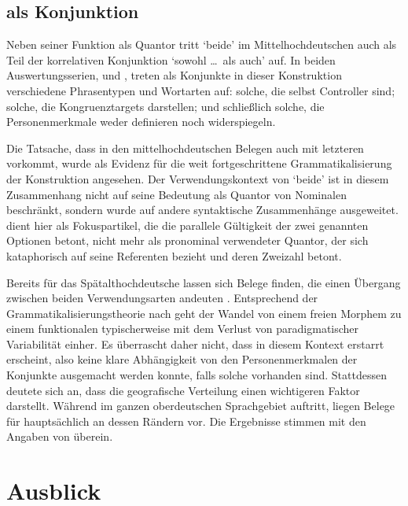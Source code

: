 \subsection{ als Konjunktion}

Neben seiner Funktion als Quantor tritt `beide' im
Mittelhochdeutschen auch als Teil der korrelativen
Konjunktion  `sowohl \dots\ als auch' auf. In beiden
Auswertungs\-serien, \CAO{} und \KC{}, treten als Konjunkte in dieser
Konstruktion verschiedene Phrasen\-typen und Wort\-arten auf: solche, die
selbst Controller sind; solche, die Kongruenztargets darstellen; und
schließlich solche, die Personenmerkmale weder definieren noch widerspiegeln.

Die Tatsache, dass  in den
mittelhochdeutschen Belegen auch mit letzteren vorkommt,
wurde als Evidenz für die weit fortgeschrittene Grammatikalisierung der
Konstruktion angesehen. Der Verwendungskontext von  `beide' ist in
diesem Zusammenhang nicht auf seine Bedeutung als Quantor von Nominalen
beschränkt, sondern wurde auf andere syntaktische Zusammenhänge ausgeweitet.
 dient hier als Fokuspartikel, die die parallele Gültigkeit der
zwei genannten Optionen betont, nicht mehr als pronominal verwendeter Quantor,
der sich kataphorisch auf seine Referenten bezieht und deren Zweizahl betont.

Bereits für das Spätalthochdeutsche lassen sich Belege
finden, die einen Übergang zwischen beiden Verwendungsarten
andeuten \autocite[vgl.\ die Beispiele in][627]{ksw2}. Entsprechend der
Grammatikalisierungstheorie nach \citet[146--150]{lehmann2015} geht der Wandel
von einem freien Morphem zu einem funktionalen typischerweise mit dem Verlust
von paradigmatischer Variabilität einher. Es überrascht daher nicht, dass
 in diesem Kontext erstarrt erscheint, also keine klare
Abhängigkeit von den Personenmerkmalen der Konjunkte ausgemacht werden konnte,
falls solche vorhanden sind. Stattdessen deutete sich an, dass die geografische
Verteilung einen wichtigeren Faktor darstellt. Während  im ganzen
oberdeutschen Sprachgebiet auftritt, liegen Belege für
 hauptsächlich an dessen Rändern vor. Die Ergebnisse stimmen mit
den Angaben von \citet[627--628]{ksw2} überein.

\section{Ausblick}

